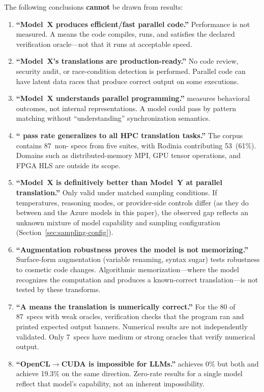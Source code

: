 The following conclusions \textbf{cannot} be drawn from \parbench{} results:

\begin{enumerate}
  \item \textbf{``Model~X produces efficient/fast parallel code.''} Performance
    is not measured. A \pass{} means the code compiles, runs, and satisfies the
    declared verification oracle---not that it runs at acceptable speed.
    
    \item \textbf{``Model~X's translations are production-ready.''} No code review, security audit, or race-condition detection is performed. Parallel code can have latent data races that produce correct output on some executions.
    
    \item \textbf{``Model~X understands parallel programming.''} \parbench{}
    measures behavioral outcomes, not internal representations. A model could
    pass by pattern matching without ``understanding'' synchronization
    semantics.

  \item \textbf{``\parbench{} pass rate generalizes to all HPC translation
    tasks.''} The corpus contains 87~non-\knownfail{} specs from five
    suites, with Rodinia contributing 53~(61\%). Domains such as distributed-memory MPI, GPU tensor operations, and FPGA HLS are outside its scope.

  \item \textbf{``Model~X is definitively better than Model~Y at parallel translation.''} Only valid under matched sampling conditions. If temperatures, reasoning modes, or provider-side controls differ (as they do between \qwenshort{} and the Azure models in this paper), the observed gap reflects an unknown mixture of model capability and sampling configuration (Section~\ref{sec:sampling-config}).

  \item \textbf{``Augmentation robustness proves the model is not
    memorizing.''} Surface-form augmentation (variable renaming, syntax sugar)
    tests robustness to cosmetic code changes. Algorithmic memorization---where
    the model recognizes the computation and produces a known-correct
    translation---is not tested by these transforms.

  \item \textbf{``A \pass{} means the translation is numerically correct.''}
    For the 80 of 87~specs with weak oracles, verification checks that the
    program ran and printed expected output banners. Numerical results are not
    independently validated. Only 7~specs have medium or strong oracles that
    verify numerical output.

    \item \textbf{``OpenCL$\to$CUDA is impossible for LLMs.''} \qwenshort{} achieves 0\% but both \gptnew{} and \codex{} achieve 19.3\% on the same direction. Zero-rate results for a single model reflect that model's capability, not an inherent impossibility.
\end{enumerate}


